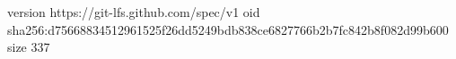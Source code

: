 version https://git-lfs.github.com/spec/v1
oid sha256:d75668834512961525f26dd5249bdb838ce6827766b2b7fc842b8f082d99b600
size 337
